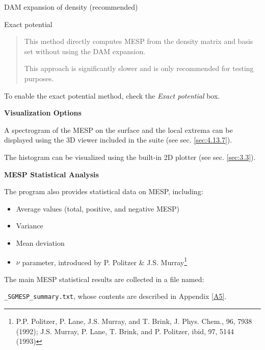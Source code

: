 \documentclass[10pt]{article}
\begin{document}
\begin{enumerate}
\item DAM expansion of density (recommended)
\item Exact potential
\vspace*{-5mm}
\begin{quote}
\item This method directly computes MESP from the density matrix and basis set
without using the DAM expansion.
\item This approach is significantly slower and is only recommended for testing purposes.
\end{quote}
\end{enumerate}

To enable the exact potential method, check the {\it Exact potential} box.

\vspace*{3mm}
{\bf Visualization Options}
\vspace*{3mm}

A spectrogram of the MESP on the surface and the local extrema
can be displayed using the 3D viewer included in the suite (see sec. \ref{sec:4.13.7}).

The histogram can be visualized using the built-in 2D plotter (see sec. \ref{sec:3.3}).

\vspace*{3mm}
{\bf MESP Statistical Analysis}
\vspace*{3mm}

The program also provides statistical data on MESP, including:

\begin{itemize}
\item Average values (total, positive, and negative MESP)
\item Variance
\item Mean deviation
\item $\nu$ parameter, introduced by P. Politzer \& J.S. Murray\footnote{P.P. Politzer, P. Lane, J.S. Murray, and T. Brink, J. Phys. Chem., 96, 7938 (1992);
J.S. Murray, P. Lane, T. Brink, and P. Politzer, ibid, 97, 5144 (1993)}
\end{itemize}

The main MESP statistical results are collected in a file named:

\texttt{\_SGMESP\_summary.txt}, whose contents are described in Appendix \ref{A5}.
\end{document}
